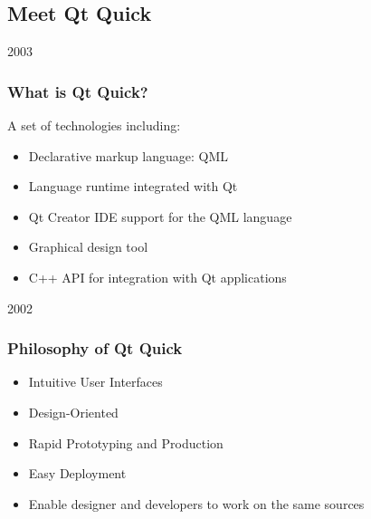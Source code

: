 %
%
%
%

\subsection{Meet Qt Quick}

\begin{slide}{2003}\frametitle{What is Qt Quick?}
\vspace*{1.5em}

A set of technologies including:
\begin{itemize}
\item Declarative markup language: QML
\item Language runtime integrated with Qt
\item Qt Creator IDE support for the QML language
\item Graphical design tool
\item C++ API for integration with Qt applications
\end{itemize}
\end{slide}

\begin{slide}{2002}\frametitle{Philosophy of Qt Quick}
\vspace*{1.5em}

\begin{itemize}
\item Intuitive User Interfaces
\item Design-Oriented
\item Rapid Prototyping and Production
\item Easy Deployment
\item Enable designer and developers to work on the same sources
\end{itemize}
\end{slide}

